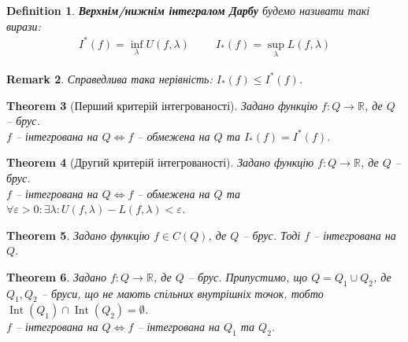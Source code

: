 \documentclass[a4paper, 10pt]{article}
\theoremstyle{theoremdd}
\newtheorem{theorem}{Theorem}[subsection]
\theoremstyle{theoremdd}
\newtheorem{definition}[theorem]{Definition}
\theoremstyle{theoremdd}
\theoremstyle{theoremdd}
\theoremstyle{theoremdd}
\theoremstyle{theoremdd}
\theoremstyle{theoremdd}
\theoremstyle{theoremdd}
\theoremstyle{theoremdd}
\theoremstyle{theoremdd}
\theoremstyle{theoremdd}
\newtheorem{remark}[theorem]{Remark}
\theoremstyle{theoremdd}
\theoremstyle{theoremdd}
\theoremstyle{theoremdd}
\theoremstyle{theoremdd}
\DeclareMathOperator{\Int}{Int}
\begin{document}
\begin{definition}
\textbf{Верхнім/нижнім інтегралом Дарбу} будемо називати такі вирази:
\begin{align*}
I^*(f) = \inf_\lambda U(f,\lambda) \hspace{1cm} I_*(f) = \sup_{\lambda} L(f,\lambda)
\end{align*}
\end{definition}

\begin{remark}
Справедлива така нерівність: $I_*(f) \leq I^*(f)$.
\end{remark}

\begin{theorem}[Перший критерій інтегрованості]
Задано функцію $f \colon Q \to \mathbb{R}$, де $Q$ -- брус.\\
$f$ -- інтегрована на $Q \iff f$ -- обмежена на $Q$ та $I_*(f) = I^*(f)$.
\end{theorem}

\begin{theorem}[Другий критерій інтегрованості]
Задано функцію $f \colon Q \to \mathbb{R}$, де $Q$ -- брус.\\
$f$ -- інтегрована на $Q \iff f$ -- обмежена на $Q$ та $\forall \varepsilon > 0: \exists \lambda: U(f,\lambda) - L(f,\lambda) < \varepsilon$.
\end{theorem}

\begin{theorem}
Задано функцію $f \in C(Q)$, де $Q$ -- брус. Тоді $f$ -- інтегрована на $Q$.
\end{theorem}

\begin{theorem}
Задано $f \colon Q \to \mathbb{R}$, де $Q$ -- брус. Припустимо, що $Q = Q_1 \cup Q_2$, де $Q_1,Q_2$ -- бруси, що не мають спільних внутрішніх точок, тобто $\Int(Q_1) \cap \Int(Q_2) = \emptyset$.\\
$f$ -- інтегрована на $Q \iff f$ -- інтегрована на $Q_1$ та $Q_2$.
\end{theorem}
\end{document}
